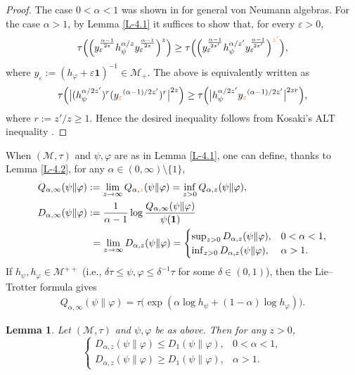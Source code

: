 \documentclass[12pt]{article}
\newtheorem{lemma}[theorem]{Lemma}
\theoremstyle{definition}
\theoremstyle{remark}
\numberwithin{equation}{section}
\def\Me{\mathcal M}
\def\ffi{\varphi}
\def\1{\mathbf{1}}
\def\eps{\varepsilon}
\begin{document}
\begin{proof}
The case $0<\alpha<1$ was shown in \cite[Theorem 1(x)]{kato2023onrenyi} for general von Neumann algebras.
For the case $\alpha>1$, by Lemma \ref{L-4.1} it suffices to show that, for every $\eps>0$,
\[
\tau\Bigl(\Bigl(y_\eps^{\alpha-1\over2z}h_\psi^{\alpha/z}y_\eps^{\alpha-1\over2z}\Bigr)^z\Bigr)
\ge\tau\Bigl(\Bigl(y_\eps^{\alpha-1\over2z'}h_\psi^{\alpha/z'}y_\eps^{\alpha-1\over2z'}\Bigr)^{\color{orange}
z'}\Bigr),
\]
where $y_\eps:=(h_\ffi+\eps\1)^{-1}\in\Me_+$. The above is equivalently written as
\[
\tau\Bigl(\big|(h_\psi^{\alpha/2z'})^r(y_{\color{orange}\eps}^{(\alpha-1)/2z'})^r\big|^{2z}\Bigr)
\ge\tau\Bigl(\big|h_\psi^{\alpha/2z'} y_{\color{orange}\eps}^{(\alpha-1)/2z'}\big|^{2zr}\Bigr),
\]
where $r:=z'/z\ge1$. Hence the desired inequality follows from Kosaki's ALT inequality
\cite[Corollary 3]{kosaki1992aninequality}.
\end{proof}

When $(\Me,\tau)$ and $\psi,\ffi$ are as in Lemma \ref{L-4.1}, one can define, thanks to Lemma \ref{L-4.2},
for any $\alpha\in(0,\infty)\setminus\{1\}$,
\begin{align}
Q_{\alpha,\infty}(\psi\|\ffi)&:=\lim_{z\to\infty}Q_{\alpha,{\color{orange} z}}(\psi\|\ffi)
=\inf_{z>0}Q_{\alpha,z}(\psi\|\ffi), \nonumber\\
D_{\alpha,\infty}(\psi\|\ffi)&:={1\over\alpha-1}\log{Q_{\alpha,\infty}(\psi\|\ffi)\over\psi(\1)} \nonumber\\
&\ =\lim_{z\to\infty}D_{\alpha,z}(\psi\|\ffi)
=\begin{cases}\sup_{z>0}D_{\alpha,z}(\psi\|\ffi), & \text{$0<\alpha<1$},\\
\inf_{z>0}D_{\alpha,z}(\psi\|\ffi), & \text{$\alpha>1$}.\end{cases} \label{F-4.9}
\end{align}
If $h_\psi,h_\ffi\in\Me^{++}$ (i.e., $\delta\tau\le\psi,\ffi\le\delta^{-1}\tau$ for some $\delta\in(0,1)$), then
the Lie--Trotter formula gives
\begin{align}\label{F-4.10}
Q_{\alpha,\infty}(\psi\|\ffi)=\tau\bigl(\exp(\alpha\log h_\psi+(1-\alpha)\log h_\ffi)\bigr).
\end{align}

\begin{lemma}\label{L-4.3}
Let $(\Me,\tau)$ and $\psi,\ffi$ be as above. Then for any $z>0$,
\[
\begin{cases}
D_{\alpha,z}(\psi\|\ffi)\le D_1(\psi\|\ffi), & \text{$0<\alpha<1$},\\
D_{\alpha,z}(\psi\|\ffi)\ge D_1(\psi\|\ffi), & \text{$\alpha>1$}.
\end{cases}
\]
\end{lemma}
\end{document}
